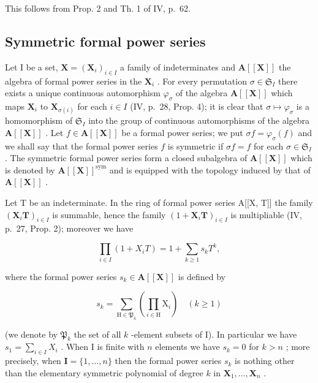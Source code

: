 This follows from Prop. 2 and Th. 1 of IV, p.~62.

\subsection{Symmetric formal power series}

Let I be a set, \(\mathbf{X} = (\mathbf{X}_i)_{i\in I}\) a family of indeterminates and \(\mathbf{A}[[\mathbf{X}]]\) the algebra of formal power series in the \(\mathbf{X}_i\) . For every permutation \(\sigma \in \mathfrak{S}_I\) there exists a unique continuous automorphism \(\varphi_{\sigma}\) of the algebra \(\mathbf{A}[[\mathbf{X}]]\) which maps \(\mathbf{X}_i\) to \(\mathbf{X}_{\sigma (i)}\) for each \(i\in I\) (IV, p.~28, Prop. 4); it is clear that \(\sigma \mapsto \varphi_{\sigma}\) is a homomorphism of \(\mathfrak{S}_I\) into the group of continuous automorphisms of the algebra \(\mathbf{A}[[\mathbf{X}]]\) . Let \(f\in \mathbf{A}[[\mathbf{X}]]\) be a formal power series; we put \(\sigma f = \varphi_{\sigma}(f)\) and we shall say that the formal power series \(f\) is symmetric if \(\sigma f = f\) for each \(\sigma \in \mathfrak{S}_I\) . The symmetric formal power series form a closed subalgebra of \(\mathbf{A}[[\mathbf{X}]]\) which is denoted by \(\mathbf{A}[[\mathbf{X}]]^{\mathrm{sym}}\) and is equipped with the topology induced by that of \(\mathbf{A}[[\mathbf{X}]]\) .

Let T be an indeterminate. In the ring of formal power series A{[}{[}X, T{]}{]} the family \((\mathbf{X}_i\mathbf{T})_{i\in I}\) is summable, hence the family \((1 + \mathbf{X}_i\mathbf{T})_{i\in I}\) is multipliable (IV, p.~27, Prop. 2); moreover we have

\[
\prod_ {i \in I} (1 + X _ {i} T) = 1 + \sum_ {k \geqslant 1} s _ {k} T ^ {k},\tag{14}
\]

where the formal power series \(s_k \in \mathbf{A}[[\mathbf{X}]]\) is defined by

\[
s _ {k} = \sum_ {\mathrm{H} \in \mathfrak {P} _ {k}} \left(\prod_ {i \in \mathrm{H}} \mathrm{X} _ {i}\right) \quad (k \geqslant 1)\tag{15}
\]

(we denote by \(\mathfrak{P}_k\) the set of all \(k\) -element subsets of I). In particular we have \(s_1 = \sum_{i \in I} X_i\) . When I is finite with \(n\) elements we have \(s_k = 0\) for \(k > n\) ; more precisely, when \(\mathbf{I} = \{1,\dots,n\}\) then the formal power series \(s_k\) is nothing other than the elementary symmetric polynomial of degree \(k\) in \(\mathbf{X}_1,\ldots,\mathbf{X}_n\) .

